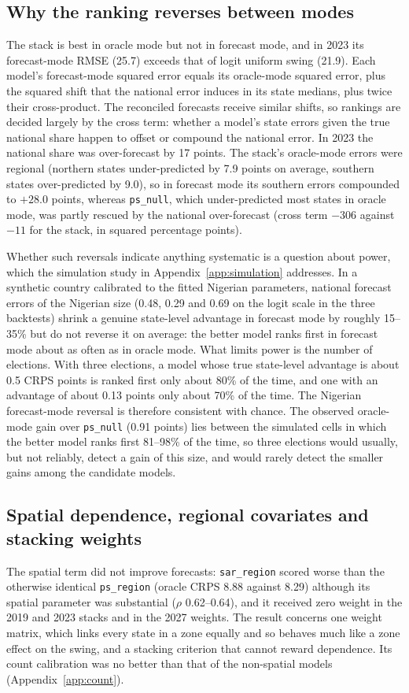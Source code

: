 \documentclass[preprint,12pt,authoryear]{elsarticle}
\begin{document}
\subsection{Why the ranking reverses between modes}
\label{sec:flip}
The stack is best in oracle mode but not in forecast mode, and in 2023 its forecast-mode RMSE (25.7) exceeds that of logit uniform swing (21.9). Each model's forecast-mode squared error equals its oracle-mode squared error, plus the squared shift that the national error induces in its state medians, plus twice their cross-product. The reconciled forecasts receive similar shifts, so rankings are decided largely by the cross term: whether a model's state errors given the true national share happen to offset or compound the national error. In 2023 the national share was over-forecast by 17 points. The stack's oracle-mode errors were regional (northern states under-predicted by 7.9 points on average, southern states over-predicted by 9.0), so in forecast mode its southern errors compounded to $+28.0$ points, whereas \texttt{ps\_null}, which under-predicted most states in oracle mode, was partly rescued by the national over-forecast (cross term $-306$ against $-11$ for the stack, in squared percentage points).

Whether such reversals indicate anything systematic is a question about power, which the simulation study in Appendix~\ref{app:simulation} addresses. In a synthetic country calibrated to the fitted Nigerian parameters, national forecast errors of the Nigerian size (0.48, 0.29 and 0.69 on the logit scale in the three backtests) shrink a genuine state-level advantage in forecast mode by roughly 15--35\% but do not reverse it on average: the better model ranks first in forecast mode about as often as in oracle mode. What limits power is the number of elections. With three elections, a model whose true state-level advantage is about 0.5 CRPS points is ranked first only about 80\% of the time, and one with an advantage of about 0.13 points only about 70\% of the time. The Nigerian forecast-mode reversal is therefore consistent with chance. The observed oracle-mode gain over \texttt{ps\_null} (0.91 points) lies between the simulated cells in which the better model ranks first 81--98\% of the time, so three elections would usually, but not reliably, detect a gain of this size, and would rarely detect the smaller gains among the candidate models.

\subsection{Spatial dependence, regional covariates and stacking weights}
The spatial term did not improve forecasts: \texttt{sar\_region} scored worse than the otherwise identical \texttt{ps\_region} (oracle CRPS 8.88 against 8.29) although its spatial parameter was substantial ($\rho$ 0.62--0.64), and it received zero weight in the 2019 and 2023 stacks and in the 2027 weights. The result concerns one weight matrix, which links every state in a zone equally and so behaves much like a zone effect on the swing, and a stacking criterion that cannot reward dependence. Its count calibration was no better than that of the non-spatial models (Appendix~\ref{app:count}).
\end{document}
